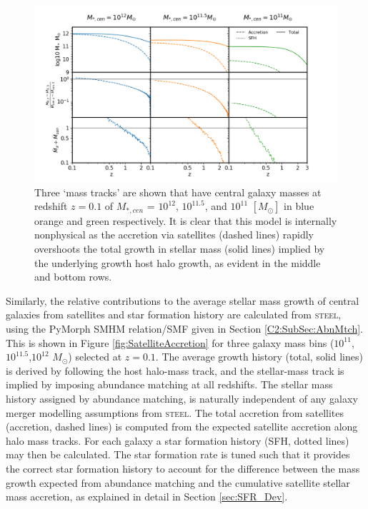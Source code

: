 \begin{figure}[h]
	\centering
	\includegraphics[width = \linewidth]{Figures/Chapter4/SatelliteAccretion_cMod.png}
    \caption{Three `mass tracks' are shown that have central galaxy masses at redshift $z = 0.1$ of $M_{*,cen}$ = $10^{12}$, $10^{11.5}$, and $10^{11}$ $[M_{\odot}]$ in blue orange and green respectively. It is clear that this model is internally nonphysical as the accretion via satellites (dashed lines) rapidly overshoots the total growth in stellar mass (solid lines) implied by the underlying growth host halo growth, as evident in the middle and bottom rows.}
	\label{fig:SatelliteAccretioncMod}
\end{figure}

Similarly, the relative contributions to the average stellar mass growth of central galaxies from satellites and star formation history are calculated from \textsc{steel}, using the PyMorph SMHM relation/SMF given in Section \ref{C2:SubSec:AbnMtch}. This is shown in Figure \ref{fig:SatelliteAccretion} for three galaxy mass bins ($10^{11}$,$10^{11.5}$,$10^{12}$ $M_{\odot}$) selected at $z = 0.1$. The average growth history (total, solid lines) is derived by following the host halo-mass track, and the stellar-mass track is implied by imposing abundance matching at all redshifts. The stellar mass history assigned by abundance matching, is naturally independent of any galaxy merger modelling assumptions from \textsc{steel}. The total accretion from satellites (accretion, dashed lines) is computed from the expected satellite accretion along halo mass tracks. For each galaxy a star formation history (SFH, dotted lines) may then be calculated. The star formation rate is tuned such that it provides the correct star formation history to account for the difference between the mass growth expected from abundance matching and the cumulative satellite stellar mass accretion, as explained in detail in Section \ref{sec:SFR_Dev}.

